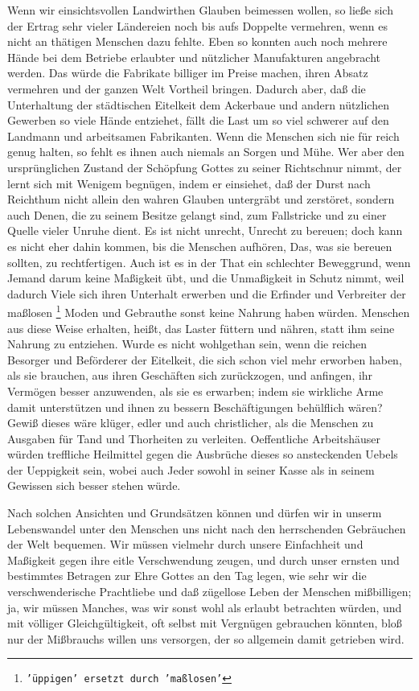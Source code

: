 {Wenn wir einsichtsvollen
Landwirthen Glauben beimessen wollen, so ließe sich der
Ertrag sehr vieler Ländereien noch bis aufs Doppelte vermehren, wenn es nicht an
thätigen Menschen dazu fehlte. Eben so konnten auch noch mehrere Hände bei dem
Betriebe erlaubter und nützlicher Manufakturen angebracht werden. Das würde die
Fabrikate billiger im Preise machen, ihren Absatz vermehren und der ganzen Welt
Vortheil bringen. Dadurch aber, daß die Unterhaltung der städtischen Eitelkeit
dem Ackerbaue und andern nützlichen Gewerben so viele Hände entziehet, fällt die
Last um so viel schwerer auf den Landmann und arbeitsamen Fabrikanten. Wenn die
Menschen sich nie für reich genug halten, so fehlt es ihnen auch niemals an
Sorgen und Mühe. Wer aber den ursprünglichen Zustand der Schöpfung Gottes zu
seiner Richtschnur nimmt, der lernt sich mit Wenigem begnügen, indem er
einsiehet, daß der Durst nach Reichthum nicht allein den wahren
Glauben
untergräbt und zerstöret, sondern auch Denen, die zu seinem Besitze gelangt
sind, zum Fallstricke und zu einer Quelle vieler Unruhe dient. Es ist nicht
unrecht, Unrecht zu bereuen; doch kann es nicht eher dahin kommen, bis die
Menschen aufhören, Das, was sie bereuen sollten, zu rechtfertigen. Auch ist es
in der That ein schlechter Beweggrund, wenn Jemand darum keine Maßigkeit übt,
und die Unmaßigkeit in Schutz nimmt, weil dadurch Viele sich ihren Unterhalt
erwerben und die Erfinder und Verbreiter der maßlosen
\footnote{\texttt{'üppigen' ersetzt durch 'maßlosen'}} Moden und Gebrauthe sonst
keine Nahrung haben würden. Menschen aus diese Weise erhalten, heißt, das Laster
füttern und nähren, statt ihm seine Nahrung zu entziehen. Wurde es nicht
wohlgethan sein, wenn die reichen Besorger und Beförderer der Eitelkeit, die
sich schon viel mehr erworben haben, als sie brauchen, aus ihren Geschäften sich
zurückzogen, und anfingen, ihr Vermögen besser anzuwenden, als sie es erwarben;
indem sie wirkliche Arme damit unterstützen und ihnen zu bessern Beschäftigungen
behülflich wären? Gewiß dieses wäre klüger, edler und auch christlicher, als die
Menschen zu Ausgaben für Tand und Thorheiten zu verleiten. Oeffentliche
Arbeitshäuser würden treffliche Heilmittel gegen die
Ausbrüche dieses so
ansteckenden Uebels der Ueppigkeit sein, wobei auch Jeder sowohl in seiner Kasse
als in seinem Gewissen sich besser stehen würde.

\medskip

Nach solchen Ansichten und Grundsätzen können und dürfen wir in unserm
Lebenswandel unter den Menschen uns nicht nach den herrschenden Gebräuchen der
Welt bequemen. Wir müssen vielmehr durch unsere Einfachheit und Maßigkeit gegen
ihre eitle Verschwendung zeugen, und durch unser ernsten und
bestimmtes Betragen
zur Ehre Gottes an den Tag legen, wie sehr wir die verschwenderische Prachtliebe
und daß zügellose Leben der Menschen mißbilligen; ja, wir müssen Manches, was
wir sonst wohl als erlaubt betrachten würden, und mit völliger Gleichgültigkeit,
oft selbst mit Vergnügen gebrauchen könnten, bloß nur der Mißbrauchs willen uns
versorgen, der so allgemein damit getrieben wird.

}
